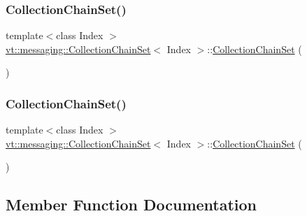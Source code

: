 \subsubsection{\texorpdfstring{Collection\+Chain\+Set()}{CollectionChainSet()}\hspace{0.1cm}{\footnotesize\ttfamily [2/3]}}
{\footnotesize\ttfamily template$<$class Index $>$ \\
\hyperlink{classvt_1_1messaging_1_1_collection_chain_set}{vt\+::messaging\+::\+Collection\+Chain\+Set}$<$ Index $>$\+::\hyperlink{classvt_1_1messaging_1_1_collection_chain_set}{Collection\+Chain\+Set} (\begin{DoxyParamCaption}\item[{const \hyperlink{classvt_1_1messaging_1_1_collection_chain_set}{Collection\+Chain\+Set}$<$ Index $>$ \&}]{ }\end{DoxyParamCaption})\hspace{0.3cm}{\ttfamily [delete]}}

\mbox{\label{classvt_1_1messaging_1_1_collection_chain_set_a21be566436c86fa59a02a1bd073a9e48}} 
\subsubsection{\texorpdfstring{Collection\+Chain\+Set()}{CollectionChainSet()}\hspace{0.1cm}{\footnotesize\ttfamily [3/3]}}
{\footnotesize\ttfamily template$<$class Index $>$ \\
\hyperlink{classvt_1_1messaging_1_1_collection_chain_set}{vt\+::messaging\+::\+Collection\+Chain\+Set}$<$ Index $>$\+::\hyperlink{classvt_1_1messaging_1_1_collection_chain_set}{Collection\+Chain\+Set} (\begin{DoxyParamCaption}\item[{\hyperlink{classvt_1_1messaging_1_1_collection_chain_set}{Collection\+Chain\+Set}$<$ Index $>$ \&\&}]{ }\end{DoxyParamCaption})\hspace{0.3cm}{\ttfamily [delete]}}



\subsection{Member Function Documentation}
\mbox{\label{classvt_1_1messaging_1_1_collection_chain_set_aefc11c9b011b4916c3b80dfc8f776239}} 
